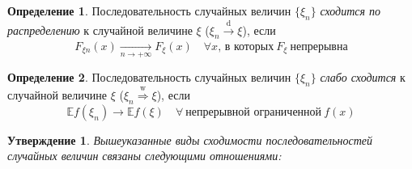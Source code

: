 \documentclass[oneside,final,14pt]{extreport}
\theoremstyle{plain}
\newtheorem*{thm*}{Утверждение}
\theoremstyle{definition}
\newtheorem*{defn}{Определение}
\theoremstyle{named}
\begin{document}
\begin{defn}
    Последовательность случайных величин $\{\xi_n\}$ {\it сходится по распределению} к случайной величине $\xi$ ($\xi_n \xrightarrow[]{\text{d}} \xi$), если
    \begin{equation*}
        F_{\xi n}(x) \xrightarrow[n \to +\infty]{} F_{\xi}(x) \quad \forall x, \, \text{в которых}~ F_{\xi} ~\text{непрерывна}
    \end{equation*}
\end{defn}

\begin{defn}
    Последовательность случайных величин $\{\xi_n\}$ {\it слабо сходится} к случайной величине $\xi$ ($\xi_n \stackrel{\text{w}}{\Rightarrow} \xi$), если
    \begin{equation*}
        \mathbb{E} f\left(\xi_{n}\right) \rightarrow \mathbb{E} f(\xi) \quad \forall~ \text{непрерывной ограниченной}~ f(x)
    \end{equation*}
\end{defn}
\begin{thm*}
    Вышеуказанные виды сходимости последовательностей случайных величин связаны следующими отношениями:
    
\end{thm*}
\end{document}

